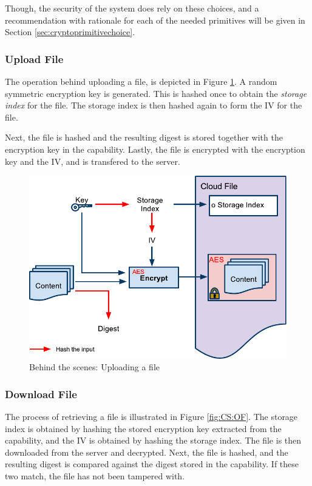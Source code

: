 \documentclass[pdftex,english,10pt,b5paper,twoside]{book}
\begin{document}
Though, the security of the system does rely on these choices, and a
recommendation with rationale for each of the needed primitives will be given
in Section \ref{sec:cryptoprimitivechoice}.

\subsubsection{Upload File}
\label{sec:CS:CF}

The operation behind uploading a file, is depicted in Figure \ref{fig:CS:CF}. A
random symmetric encryption key is generated. This is hashed once to obtain the
\emph{storage index} for the file. The storage index is then hashed again to
form the \ac{IV} for the file.

Next, the file is hashed and the resulting digest is stored together with the
encryption key in the capability. Lastly, the file is encrypted with the
encryption key and the \ac{IV}, and is transfered to the server.

\begin{figure}[h!]
    \centering
    \includegraphics[width=\columnwidth]{CryptoCreateFile.pdf}
    \caption{Behind the scenes: Uploading a file}
    \label{fig:CS:CF}
\end{figure}

\subsubsection{Download File}
\label{sec:CS:OF}

The process of retrieving a file is illustrated in Figure \ref{fig:CS:OF}. The
storage index is obtained by hashing the stored encryption key extracted from
the capability, and the \ac{IV} is obtained by hashing the storage index. The
file is then downloaded from the server and decrypted. Next, the file is
hashed, and the resulting digest is compared against the digest stored in the
capability. If these two match, the file has not been tampered with.
\end{document}
